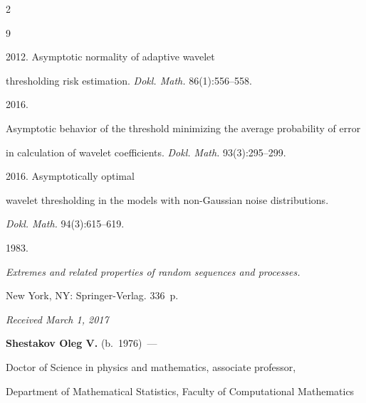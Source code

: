 \begin{multicols}{2}
{{\begin{thebibliography}{9}

 2012. Asymptotic normality of adaptive wavelet 

thresholding risk estimation. \textit{Dokl. Math.} 86(1):556--558.




 2016. 

Asymptotic behavior of the threshold minimizing the average probability of error 

in calculation of wavelet coefficients. \textit{Dokl. Math.} 93(3):295--299.




 2016. Asymptotically optimal 

wavelet thresholding in the models with non-Gaussian noise distributions. 

\textit{Dokl. Math.} 94(3):615--619.




 1983. 

\textit{Extremes and related properties of random sequences and processes.} 

New York, NY: Springer-Verlag. 336~p.

\end{thebibliography}



 }

 }



\end{multicols}



\vspace*{-3pt}



\hfill{\small\textit{Received March 1, 2017}}



\Contrl



\noindent

\textbf{Shestakov Oleg V.} (b.\ 1976)~--- 

Doctor of Science in physics and mathematics, associate professor, 

Department of Mathematical Statistics, Faculty of Computational Mathematics 

